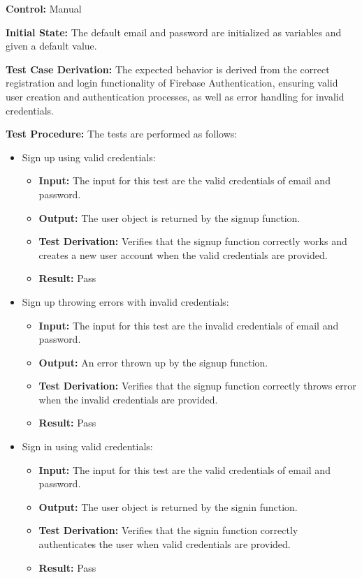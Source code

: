 \documentclass[12pt, titlepage]{article}
\begin{document}
\begin{enumerate}

  \textbf{Control:} Manual

  \textbf{Initial State:} The default email and password are initialized as variables and given a default value.

  \textbf{Test Case Derivation:} The expected behavior is derived from the correct registration and login functionality of Firebase Authentication, ensuring valid user creation and authentication processes, as well as error handling for invalid credentials.

  \textbf{Test Procedure:} The tests are performed as follows:

  \begin{itemize}
    \item Sign up using valid credentials:

    \begin{itemize}
      \item \textbf{Input:} The input for this test are the valid credentials of email and password.
      \item \textbf{Output:} The user object is returned by the signup function.
      \item \textbf{Test Derivation:} Verifies that the signup function correctly works and creates a new user account when the valid credentials are provided.
      \item \textbf{Result:} Pass
    \end{itemize}

    \item Sign up throwing errors with invalid credentials:

    \begin{itemize}
      \item \textbf{Input:} The input for this test are the invalid credentials of email and password.
      \item \textbf{Output:} An error thrown up by the signup function.
      \item \textbf{Test Derivation:} Verifies that the signup function correctly throws error when the invalid credentials are provided.
      \item \textbf{Result:} Pass
    \end{itemize}

    \item Sign in using valid credentials:

    \begin{itemize}
      \item \textbf{Input:} The input for this test are the valid credentials of email and password. 
      \item \textbf{Output:} The user object is returned by the signin function.
      \item \textbf{Test Derivation:}  Verifies that the signin function correctly authenticates the user when valid credentials are provided.
      \item \textbf{Result:} Pass
    \end{itemize}


\end{itemize}
\end{enumerate}
\end{document}
